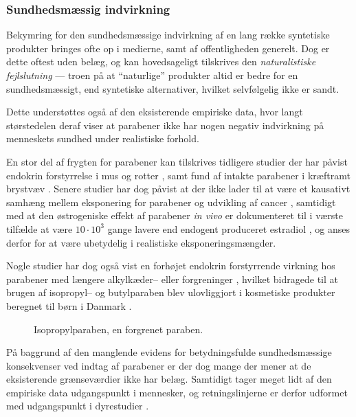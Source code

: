     \subsubsection{Sundhedsmæssig indvirkning}
    Bekymring for den sundhedsmæssige indvirkning af en lang række syntetiske produkter bringes ofte op i medierne, samt af offentligheden generelt. Dog er dette oftest uden belæg, og kan hovedsageligt tilskrives den \textit{naturalistiske fejlslutning} \parencite{Paul2007} --- troen på at ``naturlige'' produkter altid er bedre for en sundhedsmæssigt, end syntetiske alternativer, hvilket selvfølgelig ikke er sandt.

    Dette understøttes også af den eksisterende empiriske data, hvor langt størstedelen deraf viser at parabener ikke har nogen negativ indvirkning på menneskets sundhed under realistiske forhold.

    En stor del af frygten for parabener kan tilskrives tidligere studier der har påvist endokrin forstyrrelse i mus og rotter \parencite{Phil2008}, samt fund af intakte parabener i kræftramt brystvæv \parencite{Darb2004}. Senere studier har dog påvist at der ikke lader til at være et kausativt samhæng mellem eksponering for parabener og udvikling af cancer \parencite{Emil2022}, samtidigt med at den østrogeniske effekt af parabener \textit{in vivo} er dokumenteret til i værste tilfælde at være $10\cdot 10^3$ gange lavere end endogent produceret estradiol \parencite{Edwi1998}, og anses derfor for at være ubetydelig i realistiske eksponeringsmængder.

    Nogle studier har dog også vist en forhøjet endokrin forstyrrende virkning hos parabener med længere alkylkæder-- eller forgreninger \parencite{Ebru2013}, hvilket bidragede til at brugen af isopropyl-- og butylparaben blev ulovliggjort i kosmetiske produkter beregnet til børn i Danmark \parencite{Milj2013}.
    \begin{figure}[H]\centering
        \caption{Isopropylparaben, en forgrenet paraben.}
    \end{figure}
    På baggrund af den manglende evidens for betydningsfulde sundhedsmæssige konsekvenser ved indtag af parabener er der dog mange der mener at de eksisterende grænseværdier \parencite{Euro2011} ikke har belæg. Samtidigt tager meget lidt af den empiriske data udgangspunkt i mennesker, og retningslinjerne er derfor udformet med udgangspunkt i dyrestudier \parencite{Emma2016}.

